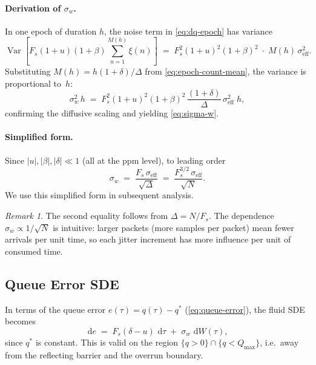 \documentclass[11pt, a4paper]{article}
\theoremstyle{definition}
\theoremstyle{plain}
\theoremstyle{remark}
\newtheorem{remark}{Remark}[section]
\newcommand{\Var}{\operatorname{Var}}
\newcommand{\dd}{\,\mathrm{d}}                   %
\begin{document}
\paragraph{Derivation of $\sigma_w$.}
In one epoch of duration $h$, the noise term in \eqref{eq:dq-epoch}
has variance
\begin{equation}\label{eq:noise-var}
  \Var\!\left[F_s(1+u)(1+\beta)\sum_{n=1}^{M(h)} \xi(n)\right]
  \;=\; F_s^2(1+u)^2(1+\beta)^2 \;\cdot\; M(h)\,\sigma_{\text{eff}}^2.
\end{equation}
Substituting $M(h) = h(1+\delta)/\Delta$ from
\eqref{eq:epoch-count-mean}, the variance is proportional to~$h$:
\begin{equation}\label{eq:noise-var-h}
  \sigma_w^2\,h
  \;=\; F_s^2(1+u)^2(1+\beta)^2\,
        \frac{(1+\delta)}{\Delta}\,
        \sigma_{\text{eff}}^2\;h,
\end{equation}
confirming the diffusive scaling and yielding \eqref{eq:sigma-w}.

\paragraph{Simplified form.}
Since $|u|, |\beta|, |\delta| \ll 1$ (all at the ppm level), to
leading order
\begin{equation}\label{eq:sigma-w-simple}
  \sigma_w \;=\; \frac{F_s\,\sigma_{\text{eff}}}{\sqrt{\Delta}}
           \;=\; \frac{F_s^{3/2}\,\sigma_{\text{eff}}}{\sqrt{N}}.
\end{equation}
We use this simplified form in subsequent analysis.

\begin{remark}
  The second equality follows from $\Delta = N/F_s$.
  The dependence $\sigma_w \propto 1/\sqrt{N}$ is intuitive: larger
  packets (more samples per packet) mean fewer arrivals per unit time,
  so each jitter increment has more influence per unit of consumed time.
\end{remark}

\subsection{Queue Error SDE}\label{sec:error-sde}

In terms of the queue error $e(\tau) = q(\tau) - q^*$
(\cref{eq:queue-error}), the fluid SDE becomes
\begin{equation}\label{eq:error-sde}
  \dd e \;=\; F_s(\delta - u)\,\dd\tau
        \;+\; \sigma_w\,\dd W(\tau),
\end{equation}
since $q^*$ is constant.  This is valid on the region $\{q > 0\}
\cap \{q < Q_{\max}\}$, i.e.\ away from the reflecting barrier and
the overrun boundary.
\end{document}
